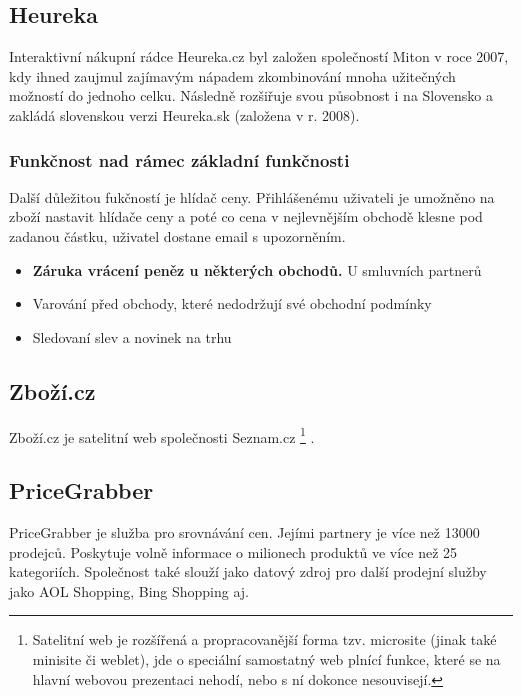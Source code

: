 \subsection{Heureka}
Interaktivní nákupní rádce Heureka.cz byl založen společností Miton v roce 2007, kdy ihned zaujmul zajímavým nápadem zkombinování mnoha užitečných možností do jednoho celku. Následně rozšiřuje svou působnost i na Slovensko a zakládá slovenskou verzi Heureka.sk (založena v r. 2008). \cite{website:wiki:heureka}

\subsubsection{Funkčnost nad rámec základní funkčnosti}
Další důležitou fukčností je hlídač ceny. Přihlášenému uživateli je umožněno na zboží nastavit hlídače ceny a poté co cena v nejlevnějším obchodě klesne pod zadanou částku, uživatel dostane email s upozorněním.

\begin{itemize}
\item \textbf{Záruka vrácení peněz u některých obchodů.} U smluvních partnerů 
\item Varování před obchody, které nedodržují své obchodní podmínky
\item Sledovaní slev a novinek na trhu
\end{itemize}
\subsection{Zboží.cz}
Zboží.cz je satelitní web společnosti Seznam.cz
\footnote{Satelitní web je rozšířená a propracovanější forma tzv. microsite (jinak také minisite či weblet), jde o speciální samostatný web plnící funkce, které se na hlavní webovou prezentaci nehodí, nebo s ní dokonce nesouvisejí.}
. 


\subsection{PriceGrabber}
PriceGrabber je služba pro srovnávání cen. Jejími partnery je více než 13000 prodejců. Poskytuje volně informace o milionech produktů ve více než 25 kategoriích. Společnost také slouží jako datový zdroj pro další prodejní služby jako AOL Shopping, Bing Shopping aj. \cite{website:wiki:pricegrabber}


